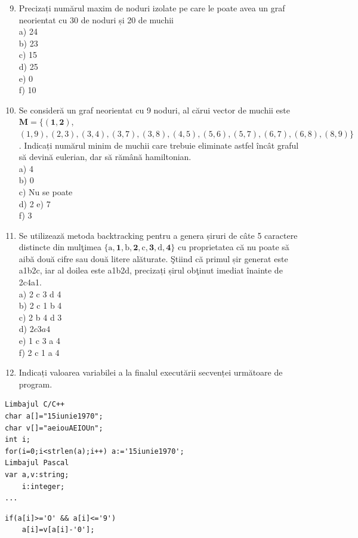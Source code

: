 \documentclass[10pt]{article}
\begin{document}
\begin{enumerate}
  \setcounter{enumi}{8}
  \item Precizați numărul maxim de noduri izolate pe care le poate avea un graf neorientat cu 30 de noduri și 20 de muchii\\
a) 24\\
b) 23\\
c) 15\\
d) 25\\
e) 0\\
f) 10
  \item Se consideră un graf neorientat cu 9 noduri, al cărui vector de muchii este $\mathbf{M}=\{(\mathbf{1}, \mathbf{2})$, $(1,9),(2,3),(3,4),(3,7),(3,8),(4,5),(5,6),(5,7),(6,7),(6,8),(8,9)\}$. Indicați numărul minim de muchii care trebuie eliminate astfel încât graful să devină eulerian, dar să rămână hamiltonian.\\
a) 4\\
b) 0\\
c) Nu se poate\\
d) 2 e) 7\\
f) 3
  \item Se utilizează metoda backtracking pentru a genera șiruri de câte 5 caractere distincte din mulţimea $\{\mathrm{a}, \mathbf{1}, \mathrm{b}, \mathbf{2}, \mathrm{c}, \mathbf{3}, \mathrm{d}, \mathbf{4}\}$ cu proprietatea că nu poate să aibă două cifre sau două litere alăturate. Ştiind că primul șir generat este a1b2c, iar al doilea este a1b2d, precizați șirul obţinut imediat înainte de 2c4a1.\\
a) 2 c 3 d 4\\
b) 2 c 1 b 4\\
c) 2 b 4 d 3\\
d) $2 c 3 a 4$\\
e) 1 c 3 a 4\\
f) 2 c 1 a 4
  \item Indicați valoarea variabilei a la finalul executării secvenței următoare de program.
\end{enumerate}

\begin{verbatim}
Limbajul C/C++
char a[]="15iunie1970";
char v[]="aeiouAEIOUn";
int i;
for(i=0;i<strlen(a);i++) a:='15iunie1970';
Limbajul Pascal
var a,v:string;
    i:integer;
...
\end{verbatim}

\begin{verbatim}
if(a[i]>='O' && a[i]<='9')
    a[i]=v[a[i]-'0'];
\end{verbatim}
\end{document}
